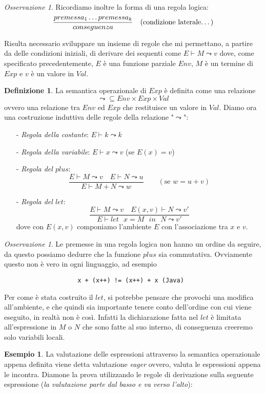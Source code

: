 \documentclass{article}
\theoremstyle{definition}
\theoremstyle{definition}
\theoremstyle{definition}
\newtheorem{definition}[theorem]{Definizione}
\newtheorem{example}[theorem]{Esempio}
\theoremstyle{remark}
\newtheorem{remark}[theorem]{Osservazione}
\begin{document}
\begin{remark}
    Ricordiamo inoltre la forma di una regola logica:
    $$\frac{premessa_1\dots premessa_k}{ conseguenza}\quad(\text{condizione laterale\dots})$$
\end{remark}
Risulta necessario sviluppare un insieme di regole che mi permettano, a partire da delle condizioni iniziali, di derivare
dei sequenti come $E\vdash M \leadsto v$ dove, come specificato precedentemente, $E$ è una funzione parziale $Env$, $M$ è un termine di $Exp$
e $v$ è un valore in $Val$.
\begin{definition}La semantica operazionale di $Exp$ è definita come una relazione
    $$\leadsto  \subseteq Env\times Exp\times Val$$
    ovvero una relazione tra $Env$ ed $Exp$ che restituisce un valore in $Val$. Diamo ora una costruzione induttiva
    delle regole della  relazione "$\leadsto$":
    \begin{itemize}
        \item [-] \textit{Regola della costante}: $E\vdash k\leadsto k$
        \item [-] \textit{Regola della variabile}: $E\vdash x \leadsto v$ (se $E(x)= v$)
        \item [-] \textit{Regola del $plus$}: $$\frac{E\vdash M\leadsto v \quad E\vdash N\leadsto u} {E\vdash M+N\leadsto w}\qquad(\text{se $w = u+v$})$$
        \item [-] \textit{Regola del $let$}: $$\frac{E\vdash M\leadsto v \quad E(x,v)\vdash N\leadsto v'}{E\vdash \text{$let$ $x=M$ $in$ $N$}\leadsto v'}$$
              dove con $E(x,v)$ componiamo l'ambiente $E$ con l'associazione tra $x$ e $v$.
    \end{itemize}
    \begin{remark}
        Le premesse in una regola logica non hanno un ordine da seguire, da questo possiamo dedurre
        che la funzione $plus$ sia commutativa. Ovviamente questo non è  vero in ogni linguaggio, ad esempio
        \begin{verbatim}                    x + (x++) != (x++) + x (Java)\end{verbatim}
        Per come è stata costruito il $let$, si potrebbe pensare che provochi una modifica all'ambiente,
        e che quindi sia importante tenere conto dell'ordine con cui viene eseguito, in realtà non è così.
        Infatti la dichiarazione  fatta nel $let$ è limitata all'espressione in $M$ o $N$ che
        sono fatte al suo interno, di conseguenza creeremo solo variabili locali.
    \end{remark}
    \begin{example} La valutazione delle espressioni attraverso la semantica operazionale appena definita viene detta valutazione \textit{eager} ovvero, valuta le espressioni appena le incontra. Diamone la prova utilizzando le regole di derivazione sulla
        seguente espressione (\textit{la valutazione parte dal basso e va verso l'alto}):


\end{example}
\end{definition}
\end{document}
